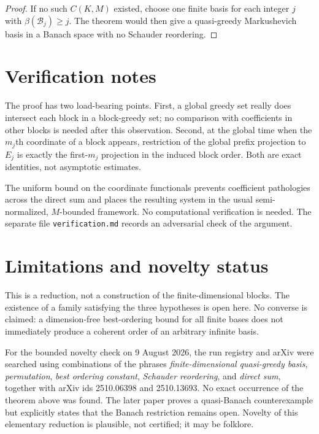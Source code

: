 \documentclass[11pt]{article}
\newcommand{\cB}{\mathcal B}
\begin{document}
\begin{proof}
If no such $C(K,M)$ existed, choose one finite basis for each integer $j$
with $\beta(\cB_j)\ge j$.  The theorem would then give a quasi-greedy
Markushevich basis in a Banach space with no Schauder reordering.
\end{proof}

\section{Verification notes}

The proof has two load-bearing points.  First, a global greedy set really does
intersect each block in a block-greedy set; no comparison with coefficients in
other blocks is needed after this observation.  Second, at the global time
when the $m_j$th coordinate of a block appears, restriction of the global
prefix projection to $E_j$ is exactly the first-$m_j$ projection in the
induced block order.  Both are exact identities, not asymptotic estimates.

The uniform bound on the coordinate functionals prevents coefficient pathologies
across the direct sum and places the resulting system in the usual
semi-normalized, $M$-bounded framework.  No computational verification is
needed.  The separate file \texttt{verification.md} records an adversarial
check of the argument.

\section{Limitations and novelty status}

This is a reduction, not a construction of the finite-dimensional blocks.
The existence of a family satisfying the three hypotheses is open here.  No
converse is claimed: a dimension-free best-ordering bound for all finite
bases does not immediately produce a coherent order of an arbitrary infinite
basis.

For the bounded novelty check on 9 August 2026, the run registry and arXiv
were searched using combinations of the phrases \emph{finite-dimensional
quasi-greedy basis}, \emph{permutation}, \emph{best ordering constant},
\emph{Schauder reordering}, and \emph{direct sum}, together with arXiv ids
2510.06398 and 2510.13693.  No exact occurrence of the theorem above was
found.  The later paper \cite{AAB2025} proves a quasi-Banach counterexample
but explicitly states that the Banach restriction remains open.  Novelty of
this elementary reduction is plausible, not certified; it may be folklore.
\end{document}
